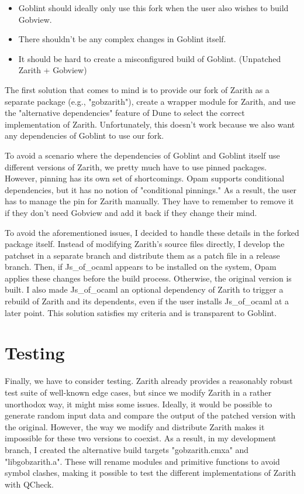 \documentclass{scrartcl}
\begin{document}
\begin{itemize}
    \item Goblint should ideally only use this fork when the user also wishes to build Gobview.
    \item There shouldn't be any complex changes in Goblint itself.
    \item It should be hard to create a misconfigured build of Goblint. (Unpatched Zarith + Gobview)
\end{itemize}

The first solution that comes to mind is to provide our fork of Zarith as a separate package (e.g., "gobzarith"), create a wrapper module for Zarith, and use the "alternative dependencies" feature of Dune to select the correct implementation of Zarith. Unfortunately, this doesn't work because we also want any dependencies of Goblint to use our fork.

To avoid a scenario where the dependencies of Goblint and Goblint itself use different versions of Zarith, we pretty much have to use pinned packages. However, pinning has its own set of shortcomings. Opam supports conditional dependencies, but it has no notion of "conditional pinnings." As a result, the user has to manage the pin for Zarith manually. They have to remember to remove it if they don't need Gobview and add it back if they change their mind.

To avoid the aforementioned issues, I decided to handle these details in the forked package itself. Instead of modifying Zarith's source files directly, I develop the patchset in a separate branch and distribute them as a patch file in a release branch. Then, if Js\_of\_ocaml appears to be installed on the system, Opam applies these changes before the build process. Otherwise, the original version is built. I also made Js\_of\_ocaml an optional dependency of Zarith to trigger a rebuild of Zarith and its dependents, even if the user installs Js\_of\_ocaml at a later point. This solution satisfies my criteria and is transparent to Goblint.

\section{Testing}

Finally, we have to consider testing. Zarith already provides a reasonably robust test suite of well-known edge cases, but since we modify Zarith in a rather unorthodox way, it might miss some issues. Ideally, it would be possible to generate random input data and compare the output of the patched version with the original. However, the way we modify and distribute Zarith makes it impossible for these two versions to coexist. As a result, in my development branch, I created the alternative build targets "gobzarith.cmxa" and "libgobzarith.a". These will rename modules and primitive functions to avoid symbol clashes, making it possible to test the different implementations of Zarith with QCheck.
\end{document}
